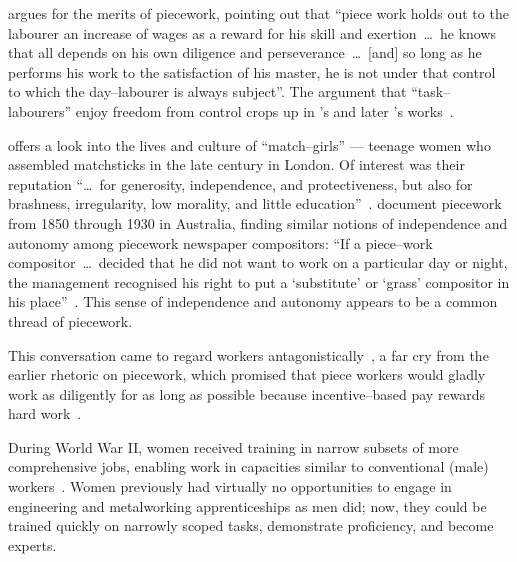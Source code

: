 \documentclass[trackingWork]{subfiles}
\begin{document}
\citeauthor{hughRaynbirdTaskWork} argues for the merits of piecework,
pointing out that
``piece work holds out to the labourer an increase of wages as a reward for his skill and exertion~\dots~he knows that all depends on his own diligence and perseverance~\dots~[and] so long as he performs his work to the satisfaction of his master, he is not under that control to which the day--labourer is always subject''.
The argument that ``task--labourers'' enjoy freedom from control crops up in \citeauthor{hughRaynbirdTaskWork}'s and later \citeauthor{rowan1901premium}'s works~\cite{hughRaynbirdTaskWork,rowan1901premium}.

\citeauthor{10.2307/3827491} offers a look into the lives and culture of ``match--girls''
--- teenage women who assembled matchsticks in the late  century in London. %
Of interest was their reputation ``\dots~for generosity, independence, and protectiveness,
but also for brashness, irregularity, low morality, and little education''~\cite{10.2307/3827491}.
\citeauthor{10.2307/27508091} document piecework from 1850 through 1930 in Australia,
finding similar notions of independence and autonomy among piecework newspaper compositors:
``If a piece--work compositor~\dots~decided that he did not want to work on a particular day or night, the management recognised his right to put a `substitute' or `grass' compositor in his place''~\cite{10.2307/27508091}.
This sense of independence and autonomy appears to be a common thread of piecework.

This conversation came to regard workers antagonistically~\cite{roy1954efficiency}, a far cry from the earlier rhetoric on piecework, which promised that
piece workers would gladly work as diligently for as long as possible because
incentive--based pay rewards hard work~\cite{clark1908cotton}.


During World War II, women received training in narrow subsets of more comprehensive jobs, enabling work in capacities similar to conventional (male) workers~\cite{hart2013rise}.
Women previously had virtually no opportunities
to engage in engineering and metalworking apprenticeships as men did;
now, they
could be trained quickly on narrowly scoped tasks,
demonstrate proficiency, and become experts.
\end{document}
